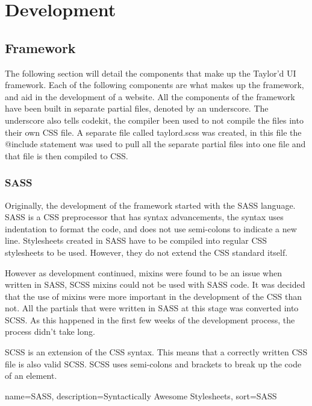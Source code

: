 \chapter*{Development}
\section*{Framework}
The following section will detail the components that make up the Taylor'd UI framework. Each of the following components are what makes up the framework, and aid in the development of a website. All the components of the framework have been built in separate partial files, denoted by an underscore. The underscore also tells codekit, the compiler been used to not compile the files into their own \gls{CSS} file. A separate file called taylord.scss was created, in this file the @include statement was used to pull all the separate partial files into one file and that file is then compiled to \gls{CSS}. 

\subsection*{SASS}

Originally, the development of the framework started with the \gls{SASS} language. \gls{SASS} is a \gls{CSS} preprocessor that has syntax advancements, the syntax uses indentation to format the code, and does not use semi-colons to indicate a new line. Stylesheets created in \gls{SASS} have to be compiled into regular \gls{CSS} stylesheets to be used. However, they do not extend the \gls{CSS} standard itself. 

However as development continued, mixins were found to be an issue when written in \gls{SASS}, \gls{SCSS} mixins could not be used with \gls{SASS} code. It was decided that the use of mixins were more important in the development of the \gls{CSS} than not. All the partials that were written in \gls{SASS} at this stage was converted into \gls{SCSS}. As this happened in the first few weeks of the development process, the process didn't take long. 

\gls{SCSS} is an extension of the \gls{CSS} syntax. This means that a correctly written \gls{CSS} file is also valid \gls{SCSS}. \gls{SCSS} uses semi-colons and brackets to break up the code of an element. 

%
{
  name={SASS},
  description={Syntactically Awesome Stylesheets},
  sort=SASS
}
%


